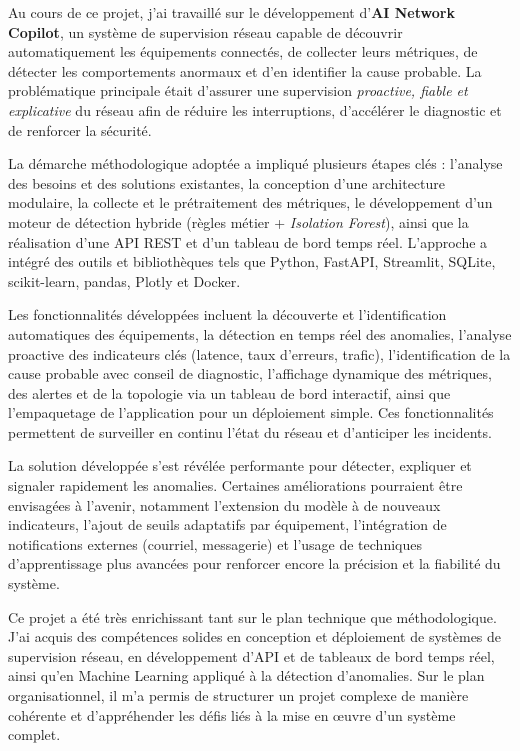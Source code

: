 \documentclass[12pt,a4paper]{report}
\begin{document}
Au cours de ce projet, j'ai travaillé sur le développement d'\textbf{AI Network
Copilot}, un système de supervision réseau capable de découvrir automatiquement les
équipements connectés, de collecter leurs métriques, de détecter les comportements
anormaux et d'en identifier la cause probable. La problématique principale était
d'assurer une supervision \emph{proactive, fiable et explicative} du réseau afin de
réduire les interruptions, d'accélérer le diagnostic et de renforcer la sécurité.

La démarche méthodologique adoptée a impliqué plusieurs étapes clés : l'analyse des
besoins et des solutions existantes, la conception d'une architecture modulaire, la
collecte et le prétraitement des métriques, le développement d'un moteur de
détection hybride (règles métier + \textit{Isolation Forest}), ainsi que la
réalisation d'une API REST et d'un tableau de bord temps réel. L'approche a intégré
des outils et bibliothèques tels que Python, FastAPI, Streamlit, SQLite,
scikit-learn, pandas, Plotly et Docker.

Les fonctionnalités développées incluent la découverte et l'identification
automatiques des équipements, la détection en temps réel des anomalies, l'analyse
proactive des indicateurs clés (latence, taux d'erreurs, trafic), l'identification
de la cause probable avec conseil de diagnostic, l'affichage dynamique des
métriques, des alertes et de la topologie via un tableau de bord interactif, ainsi
que l'empaquetage de l'application pour un déploiement simple. Ces fonctionnalités
permettent de surveiller en continu l'état du réseau et d'anticiper les incidents.

La solution développée s'est révélée performante pour détecter, expliquer et
signaler rapidement les anomalies. Certaines améliorations pourraient être
envisagées à l'avenir, notamment l'extension du modèle à de nouveaux indicateurs,
l'ajout de seuils adaptatifs par équipement, l'intégration de notifications
externes (courriel, messagerie) et l'usage de techniques d'apprentissage plus
avancées pour renforcer encore la précision et la fiabilité du système.

Ce projet a été très enrichissant tant sur le plan technique que méthodologique.
J'ai acquis des compétences solides en conception et déploiement de systèmes de
supervision réseau, en développement d'API et de tableaux de bord temps réel, ainsi
qu'en Machine Learning appliqué à la détection d'anomalies. Sur le plan
organisationnel, il m'a permis de structurer un projet complexe de manière cohérente
et d'appréhender les défis liés à la mise en œuvre d'un système complet.
\end{document}
